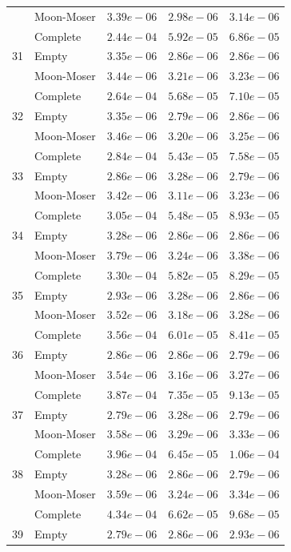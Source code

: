 \documentclass[12pt,a4paper]{article}
\begin{document}
\begin{longtable}{|l||l|l|l|l|}
  & Moon-Moser & $3.39e-06$ & $2.98e-06$ & $3.14e-06$ \\
  & Complete & $2.44e-04$ & $5.92e-05$ & $6.86e-05$ \\
  \hline
  31 & Empty & $3.35e-06$ & $2.86e-06$ & $2.86e-06$ \\
  & Moon-Moser & $3.44e-06$ & $3.21e-06$ & $3.23e-06$ \\
  & Complete & $2.64e-04$ & $5.68e-05$ & $7.10e-05$ \\
  \hline
  32 & Empty & $3.35e-06$ & $2.79e-06$ & $2.86e-06$ \\
  & Moon-Moser & $3.46e-06$ & $3.20e-06$ & $3.25e-06$ \\
  & Complete & $2.84e-04$ & $5.43e-05$ & $7.58e-05$ \\
  \hline
  33 & Empty & $2.86e-06$ & $3.28e-06$ & $2.79e-06$ \\
  & Moon-Moser & $3.42e-06$ & $3.11e-06$ & $3.23e-06$ \\
  & Complete & $3.05e-04$ & $5.48e-05$ & $8.93e-05$ \\
  \hline
  34 & Empty & $3.28e-06$ & $2.86e-06$ & $2.86e-06$ \\
  & Moon-Moser & $3.79e-06$ & $3.24e-06$ & $3.38e-06$ \\
  & Complete & $3.30e-04$ & $5.82e-05$ & $8.29e-05$ \\
  \hline
  35 & Empty & $2.93e-06$ & $3.28e-06$ & $2.86e-06$ \\
  & Moon-Moser & $3.52e-06$ & $3.18e-06$ & $3.28e-06$ \\
  & Complete & $3.56e-04$ & $6.01e-05$ & $8.41e-05$ \\
  \hline
  36 & Empty & $2.86e-06$ & $2.86e-06$ & $2.79e-06$ \\
  & Moon-Moser & $3.54e-06$ & $3.16e-06$ & $3.27e-06$ \\
  & Complete & $3.87e-04$ & $7.35e-05$ & $9.13e-05$ \\
  \hline
  37 & Empty & $2.79e-06$ & $3.28e-06$ & $2.79e-06$ \\
  & Moon-Moser & $3.58e-06$ & $3.29e-06$ & $3.33e-06$ \\
  & Complete & $3.96e-04$ & $6.45e-05$ & $1.06e-04$ \\
  \hline
  38 & Empty & $3.28e-06$ & $2.86e-06$ & $2.79e-06$ \\
  & Moon-Moser & $3.59e-06$ & $3.24e-06$ & $3.34e-06$ \\
  & Complete & $4.34e-04$ & $6.62e-05$ & $9.68e-05$ \\
  \hline
  39 & Empty & $2.79e-06$ & $2.86e-06$ & $2.93e-06$ \\

\end{longtable}
\end{document}
